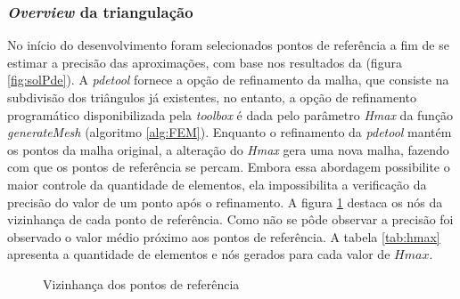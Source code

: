 \documentclass[
    12pt,               %
    openright,          %
    oneside,
    a4paper,            %
    english,            %
    french,             %
    spanish,            %
    brazil              %
    ]{abntex2}
\begin{document}
\subsubsection*{\textit{Overview} da triangulação}
No início do desenvolvimento foram selecionados pontos de referência a fim de se estimar a precisão das aproximações, com base nos resultados da  (figura \ref{fig:solPde}).
A \textit{pdetool} fornece a opção de refinamento da malha, que consiste na subdivisão dos triângulos já existentes, no entanto, a opção de refinamento programático disponibilizada pela \textit{toolbox} é dada pelo parâmetro \textit{Hmax} da função \textit{generateMesh} (algoritmo \ref{alg:FEM}). Enquanto o refinamento da \textit{pdetool} mantém os pontos da malha original, a alteração do \textit{Hmax} gera uma nova malha, fazendo com que os pontos de referência se percam. Embora essa abordagem possibilite o maior controle da quantidade de elementos, ela impossibilita a verificação da precisão do valor de um ponto após o refinamento. A figura \ref{fig:vizinha} destaca os nós da vizinhança de cada ponto de referência. Como não se pôde observar a precisão foi observado o valor médio próximo aos pontos de referência.  A tabela \ref{tab:hmax} apresenta a quantidade de elementos e nós gerados para cada valor de $Hmax$.


\begin{figure}%
	\centering	
	\qquad
	\caption{Vizinhança dos pontos de referência}%
	\label{fig:vizinha}%
\end{figure}
\end{document}
